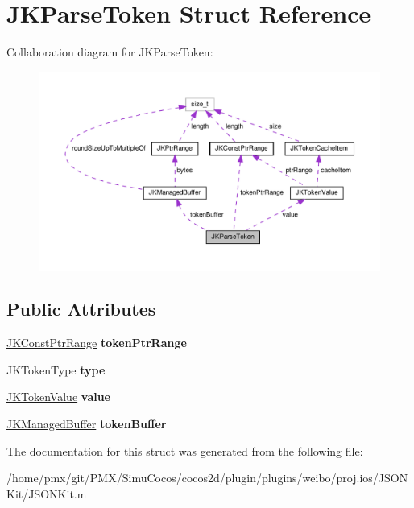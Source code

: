 \hypertarget{structJKParseToken}{}\section{J\+K\+Parse\+Token Struct Reference}
\label{structJKParseToken}


Collaboration diagram for J\+K\+Parse\+Token\+:
\nopagebreak
\begin{figure}[H]
\begin{center}
\leavevmode
\includegraphics[width=350pt]{structJKParseToken__coll__graph}
\end{center}
\end{figure}
\subsection*{Public Attributes}
\begin{DoxyCompactItemize}
\item 
\mbox{\label{structJKParseToken_a435901def67b18cedd8ac6c3ab593e0e}} 
\hyperlink{structJKConstPtrRange}{J\+K\+Const\+Ptr\+Range} {\bfseries token\+Ptr\+Range}
\item 
\mbox{\label{structJKParseToken_abafcf1667d5f2c7aebe4594cff2170fe}} 
J\+K\+Token\+Type {\bfseries type}
\item 
\mbox{\label{structJKParseToken_aa961078ffa70513ad240af905ce3fd71}} 
\hyperlink{structJKTokenValue}{J\+K\+Token\+Value} {\bfseries value}
\item 
\mbox{\label{structJKParseToken_a0da21fecd02b19d8bc53bb62b4c99e2a}} 
\hyperlink{structJKManagedBuffer}{J\+K\+Managed\+Buffer} {\bfseries token\+Buffer}
\end{DoxyCompactItemize}


The documentation for this struct was generated from the following file\+:\begin{DoxyCompactItemize}
\item 
/home/pmx/git/\+P\+M\+X/\+Simu\+Cocos/cocos2d/plugin/plugins/weibo/proj.\+ios/\+J\+S\+O\+N\+Kit/J\+S\+O\+N\+Kit.\+m\end{DoxyCompactItemize}
